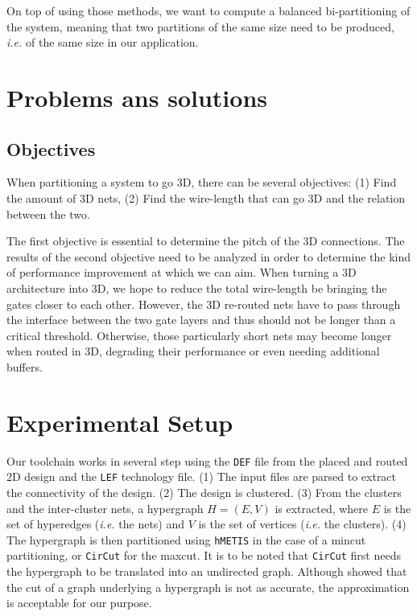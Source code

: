 \documentclass[conference]{IEEEtran}
\begin{document}
On top of using those methods, we want to compute a balanced bi-partitioning of the system, meaning that two partitions of the same size need to be produced, \textit{i.e.} of the same size in our application.

\newpage

\section{Problems ans solutions}



\subsection{Objectives}
When partitioning a system to go 3D, there can be several objectives: (1) Find the amount of 3D nets, (2) Find the wire-length that can go 3D and the relation between the two.

The first objective is essential to determine the pitch of the 3D connections.
The results of the second objective need to be analyzed in order to determine the kind of performance improvement at which we can aim.
When turning a 3D architecture into 3D, we hope to reduce the total wire-length be bringing the gates closer to each other.
However, the 3D re-routed nets have to pass through the interface between the two gate layers and thus should not be longer than a critical threshold.
Otherwise, those particularly short nets may become longer when routed in 3D, degrading their performance or even needing additional buffers.

\newpage

\section{Experimental Setup}

Our toolchain works in several step using the \texttt{DEF} file from the placed and routed 2D design and the \texttt{LEF} technology file.
(1) The input files are parsed to extract the connectivity of the design.
(2) The design is clustered.
(3) From the clusters and the inter-cluster nets, a hypergraph $H = (E, V)$ is extracted, where $E$ is the set of hyperedges (\textit{i.e.} the nets) and $V$ is the set of vertices (\textit{i.e.} the clusters).
(4) The hypergraph is then partitioned using \texttt{hMETIS} in the case of a mincut partitioning, or \texttt{CirCut} for the maxcut.
It is to be noted that \texttt{CirCut} first needs the hypergraph to be translated into an undirected graph.
Although \cite{IhlerEdmund;WagnerDorothea;Wagner1993} showed that the cut of a graph underlying a hypergraph is not as accurate, the approximation is acceptable for our purpose.
\end{document}
